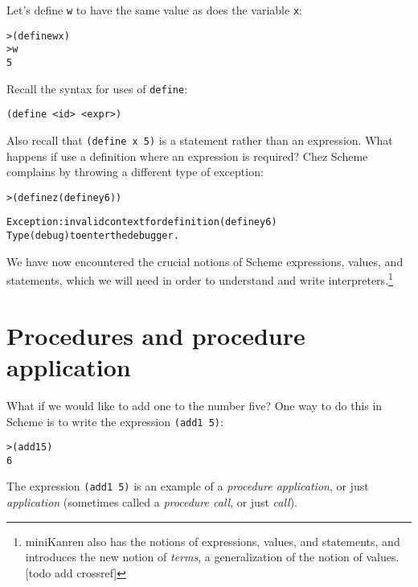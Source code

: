 \documentclass{book}
\begin{document}
Let's define \verb|w| to have the same value as does the variable \verb|x|:

\begin{alltt}
> (define w x)
> w
5
\end{alltt}



Recall the syntax for uses of \verb|define|:

\verb|(define <id> <expr>)|

\noindent
Also recall that \verb|(define x 5)| is a statement rather than an expression.
What happens if use a definition where an expression is required?  Chez Scheme complains by throwing a different type of exception:

\begin{alltt}
> (define z (define y 6))

Exception: invalid context for definition (define y 6)
Type (debug) to enter the debugger.
\end{alltt}

We have now encountered the crucial notions of Scheme expressions, values, and statements, which we will need in order to understand and write interpreters.\footnote{miniKanren also has the notions of expressions, values, and statements, and introduces the new notion of \emph{terms}, a generalization of the notion of values. [todo add crossref]}

\section{Procedures and procedure application}

What if we would like to add one to the number five?  One way to do this in Scheme is to write the expression \verb|(add1 5)|:

\begin{alltt}
> (add1 5)
6
\end{alltt}


The expression \verb|(add1 5)| is an example of a \emph{procedure application}, or just \emph{application} (sometimes called a \emph{procedure call}, or just \emph{call}).
\end{document}
